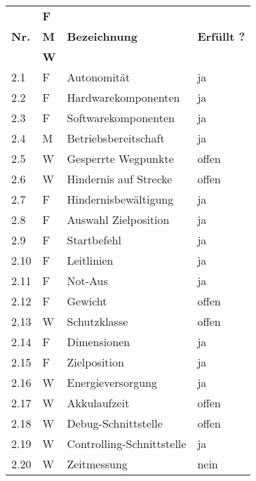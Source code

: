 \documentclass[main.tex]{subfiles} %
\begin{document}
\begin{tabular}{|l|p{0.5cm}|p{4cm}|p{10cm}|}
  \hline
               & \textbf{F} &                           &                    \\
  \textbf{Nr.} & \textbf{M} & \textbf{Bezeichnung}      & \textbf{Erfüllt ?} \\
               & \textbf{W} &                           &                    \\
  \hline
  2.1          & F          & Autonomität               & ja                 \\
  2.2          & F          & Hardwarekomponenten       & ja                 \\
  2.3          & F          & Softwarekomponenten       & ja                 \\
  2.4          & M          & Betriebsbereitschaft      & ja                 \\
  2.5          & W          & Gesperrte Wegpunkte       & offen              \\
  2.6          & W          & Hindernis auf Strecke     & offen              \\
  2.7          & F          & Hindernisbewältigung      & ja                 \\
  2.8          & F          & Auswahl Zielposition      & ja                 \\
  2.9          & F          & Startbefehl               & ja                 \\
  2.10         & F          & Leitlinien                & ja                 \\
  2.11         & F          & Not-Aus                   & ja                 \\
  2.12         & F          & Gewicht                   & offen              \\
  2.13         & W          & Schutzklasse              & offen              \\
  2.14         & F          & Dimensionen               & ja                 \\
  2.15         & F          & Zielposition              & ja                 \\
  2.16         & W          & Energieversorgung         & ja                 \\
  2.17         & W          & Akkulaufzeit              & offen              \\
  2.18         & W          & Debug-Schnittstelle       & offen              \\
  2.19         & W          & Controlling-Schnittstelle & ja                 \\
  2.20         & W          & Zeitmessung               & nein               \\
  \hline
\end{tabular}
\end{document}
